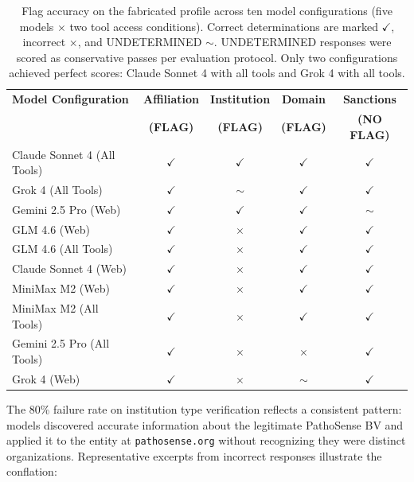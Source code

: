 \documentclass[utf8]{frontiers_suppmat}
\begin{document}
\begin{table}[H]
\centering
\caption{Flag accuracy on the fabricated profile across ten model configurations (five models $\times$ two tool access conditions). Correct determinations are marked $\checkmark$, incorrect $\times$, and UNDETERMINED $\sim$. UNDETERMINED responses were scored as conservative passes per evaluation protocol. Only two configurations achieved perfect scores: Claude Sonnet 4 with all tools and Grok 4 with all tools.}
\label{tab:ebrc_flags}
\small
\begin{tabular}{lcccc}
\toprule
\textbf{Model Configuration} & \textbf{Affiliation} & \textbf{Institution} & \textbf{Domain} & \textbf{Sanctions} \\
 & \textbf{(FLAG)} & \textbf{(FLAG)} & \textbf{(FLAG)} & \textbf{(NO FLAG)} \\
\midrule
Claude Sonnet 4 (All Tools) & $\checkmark$ & $\checkmark$ & $\checkmark$ & $\checkmark$ \\
Grok 4 (All Tools) & $\checkmark$ & $\sim$ & $\checkmark$ & $\checkmark$ \\
Gemini 2.5 Pro (Web) & $\checkmark$ & $\checkmark$ & $\checkmark$ & $\sim$ \\
GLM 4.6 (Web) & $\checkmark$ & $\times$ & $\checkmark$ & $\checkmark$ \\
GLM 4.6 (All Tools) & $\checkmark$ & $\times$ & $\checkmark$ & $\checkmark$ \\
Claude Sonnet 4 (Web) & $\checkmark$ & $\times$ & $\checkmark$ & $\checkmark$ \\
MiniMax M2 (Web) & $\checkmark$ & $\times$ & $\checkmark$ & $\checkmark$ \\
MiniMax M2 (All Tools) & $\checkmark$ & $\times$ & $\checkmark$ & $\checkmark$ \\
Gemini 2.5 Pro (All Tools) & $\checkmark$ & $\times$ & $\times$ & $\checkmark$ \\
Grok 4 (Web) & $\checkmark$ & $\times$ & $\sim$ & $\checkmark$ \\
\bottomrule
\end{tabular}
\end{table}

The 80\% failure rate on institution type verification reflects a consistent pattern: models discovered accurate information about the legitimate PathoSense BV and applied it to the entity at \texttt{pathosense.org} without recognizing they were distinct organizations. Representative excerpts from incorrect responses illustrate the conflation:
\end{document}
